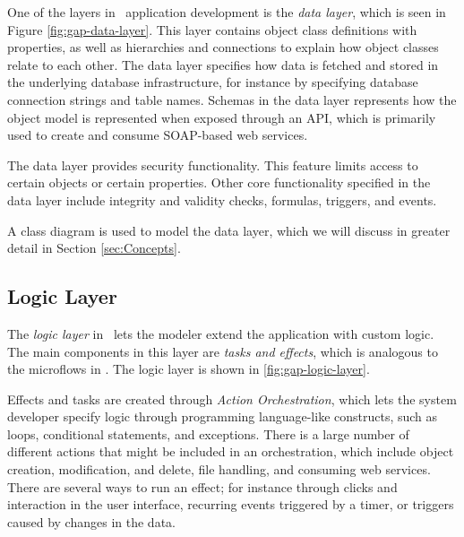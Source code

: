 One of the layers in \gap~application development is the \textit{data layer}, which is seen in Figure \ref{fig:gap-data-layer}. This layer contains object class definitions with properties, as well as hierarchies and connections to explain how object classes relate to each other. The data layer specifies how data is fetched and stored in the underlying database infrastructure, for instance by specifying database connection strings and table names. Schemas in the data layer represents how the object model is represented when exposed through an API, which is primarily used to create and consume SOAP-based web services.

The data layer provides security functionality. This feature limits access to certain objects or certain properties. Other core functionality specified in the data layer include integrity and validity checks, formulas, triggers, and events.

A class diagram is used to model the data layer, which we will discuss in greater detail in Section \ref{sec:Concepts}.

\subsection{Logic Layer}
\label{sub:Logic Layer}


The \textit{logic layer} in \gap~lets the modeler extend the application with custom logic. The main components in this layer are \textit{tasks and effects}, which is analogous to the microflows in \mendix.  The logic layer is shown in \ref{fig:gap-logic-layer}.

Effects and tasks are created through \textit{Action Orchestration}, which lets the system developer specify logic through programming language-like constructs, such as loops, conditional statements, and exceptions. There is a large number of different actions that might be included in an orchestration, which include object creation, modification, and delete, file handling, and consuming web services. There are several ways to run an effect; for instance through clicks and interaction in the user interface, recurring events triggered by a timer, or triggers caused by changes in the data.

